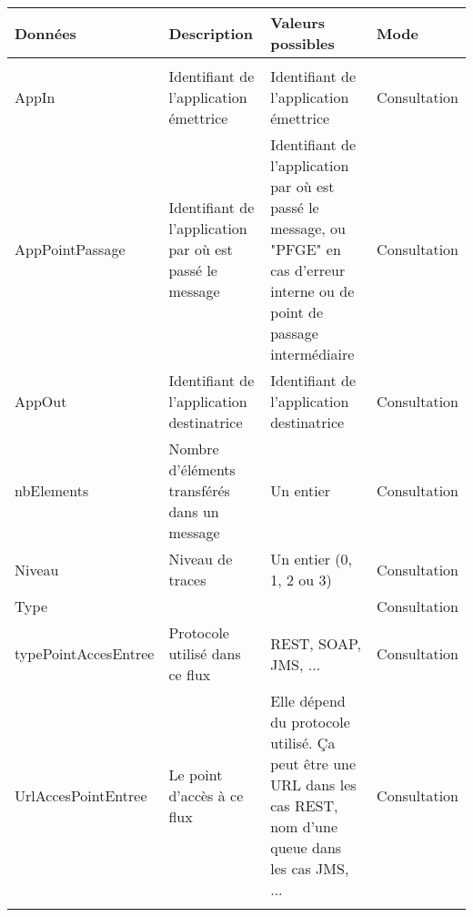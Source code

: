 \begin{longtable}{|>{\setlength{\hsize}{.8\hsize}}X|>{\setlength{\hsize}{.8\hsize}}X|>{\setlength{\hsize}{1.6\hsize}}X|>{\setlength{\hsize}{.8\hsize}}X|}
	\hline	\rowcolor{red}
	Données& Description& Valeurs possibles& Mode\\
	\hline\hline	\rowcolor{blue}
	\multicolumn{4}{|c|}{Attribute} \\\hline	\rowcolor{grisFonce}
	AppIn& Identifiant de l'application émettrice&
	Identifiant de l'application émettrice&
	Consultation\\\hline\rowcolor{gris}
	
	AppPointPassage& Identifiant de l'application par où est passé le message
	&Identifiant de l'application par où est passé le message, ou "PFGE" en cas d'erreur interne ou de point de passage intermédiaire
	&Consultation\\\hline\rowcolor{grisFonce}
	
	AppOut& Identifiant de l'application destinatrice
	&Identifiant de l'application destinatrice
	&Consultation\\\hline\rowcolor{gris}
	
	nbElements& Nombre d'éléments transférés dans un message
	&Un entier& Consultation\\\hline\rowcolor{grisFonce}
	
	Niveau& Niveau de traces& Un entier (0, 1, 2 ou 3)& Consultation\\\hline\rowcolor{gris}
	 Type&&& Consultation\\\hline\rowcolor{grisFonce}
	
	typePointAccesEntree& Protocole utilisé dans ce flux&
	REST, SOAP, JMS, ... &Consultation\\\hline\rowcolor{gris}
	
	UrlAccesPointEntree& Le point d'accès à ce flux& Elle dépend du protocole utilisé. Ça peut être une URL dans les cas REST, nom d'une queue dans les cas JMS, ...
	&Consultation\\\hline\rowcolor{grisFonce}
	

\end{longtable}
